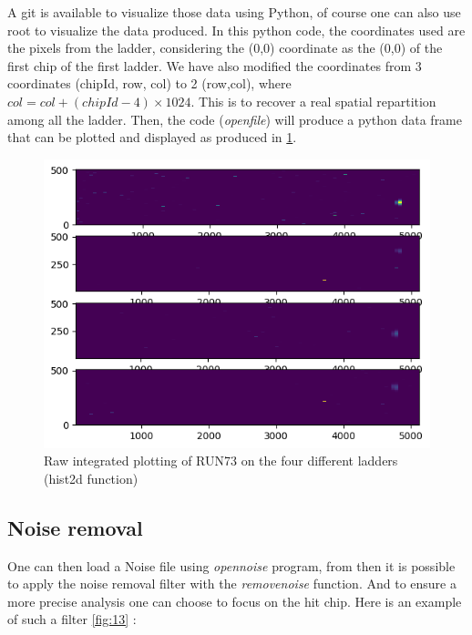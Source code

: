 \documentclass[12pt,oneside,a4]{article}
\begin{document}
A git \cite{DataVisualisation} is available to visualize those data using Python, of course one can also use root to visualize the data produced. 
In this python code, the coordinates used are the pixels from the ladder, considering the (0,0) coordinate as the (0,0) of the first chip of the first ladder. We have also modified the coordinates from 3 coordinates (chipId, row, col) to 2 (row,col), where $col=col+(chipId-4) \times 1024$. This is to recover a real spatial repartition among all the ladder.
Then, the code (\textit{open\textunderscore file}) will produce a python data frame that can be plotted and displayed as produced in \ref{fig:12}.

\begin{figure}[h]
        \centering
        \includegraphics[scale =0.7]{figures/Without_noise removal.png}
        \caption{Raw integrated plotting of RUN73 on the four different ladders (hist2d function)}
        \label{fig:12}
\end{figure}

    \subsection{Noise removal}
    
One can then load a Noise file using \textit{open\textunderscore noise} program, from then it is possible to apply the noise removal filter with the \textit{remove\textunderscore noise} function. And to ensure a more precise analysis one can choose to focus on the hit chip. Here is an example of such a filter \ref{fig:13} :
\end{document}
